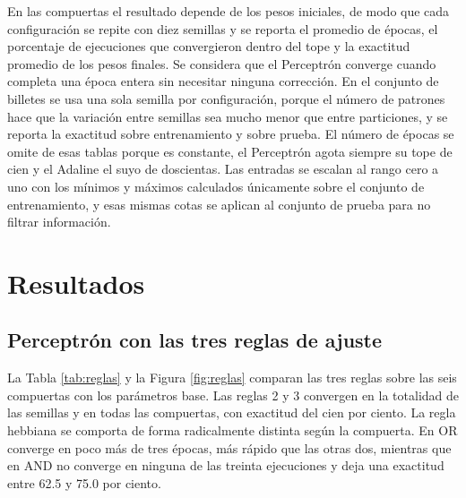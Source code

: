 \documentclass[11pt,letterpaper]{article}
\begin{document}
En las compuertas el resultado depende de los pesos iniciales, de modo que cada configuración se repite con diez semillas y se reporta el promedio de épocas, el porcentaje de ejecuciones que convergieron dentro del tope y la exactitud promedio de los pesos finales. Se considera que el Perceptrón converge cuando completa una época entera sin necesitar ninguna corrección. En el conjunto de billetes se usa una sola semilla por configuración, porque el número de patrones hace que la variación entre semillas sea mucho menor que entre particiones, y se reporta la exactitud sobre entrenamiento y sobre prueba. El número de épocas se omite de esas tablas porque es constante, el Perceptrón agota siempre su tope de cien y el Adaline el suyo de doscientas. Las entradas se escalan al rango cero a uno con los mínimos y máximos calculados únicamente sobre el conjunto de entrenamiento, y esas mismas cotas se aplican al conjunto de prueba para no filtrar información.

\section{Resultados}

\subsection{Perceptrón con las tres reglas de ajuste}

La Tabla \ref{tab:reglas} y la Figura \ref{fig:reglas} comparan las tres reglas sobre las seis compuertas con los parámetros base. Las reglas 2 y 3 convergen en la totalidad de las semillas y en todas las compuertas, con exactitud del cien por ciento. La regla hebbiana se comporta de forma radicalmente distinta según la compuerta. En OR converge en poco más de tres épocas, más rápido que las otras dos, mientras que en AND no converge en ninguna de las treinta ejecuciones y deja una exactitud entre 62.5 y 75.0 por ciento.
\end{document}
